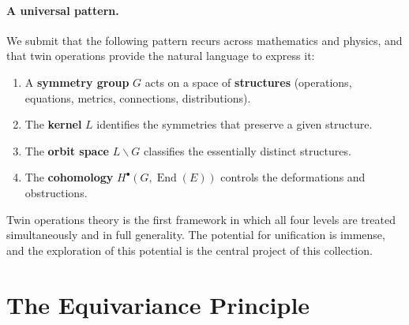 \documentclass[11pt,a4paper,openany]{book}
\theoremstyle{plain}
\theoremstyle{definition}
\newcommand{\lingroup}{L}
\newcommand{\actspace}{E}
\newcommand{\groupG}{G}
\DeclareMathOperator{\End}{End}
\begin{document}
\paragraph{A universal pattern.} We submit that the following pattern recurs across mathematics and physics, and that twin operations provide the natural language to express it:

\begin{enumerate}
\item A \textbf{symmetry group} $\groupG$ acts on a space of \textbf{structures} (operations, equations, metrics, connections, distributions).
\item The \textbf{kernel} $\lingroup$ identifies the symmetries that preserve a given structure.
\item The \textbf{orbit space} $\lingroup\backslash\groupG$ classifies the essentially distinct structures.
\item The \textbf{cohomology} $H^\bullet(\groupG, \End(\actspace))$ controls the deformations and obstructions.
\end{enumerate}

Twin operations theory is the first framework in which all four levels are treated simultaneously and in full generality. The potential for unification is immense, and the exploration of this potential is the central project of this collection.

\section{The Equivariance Principle}
\end{document}
